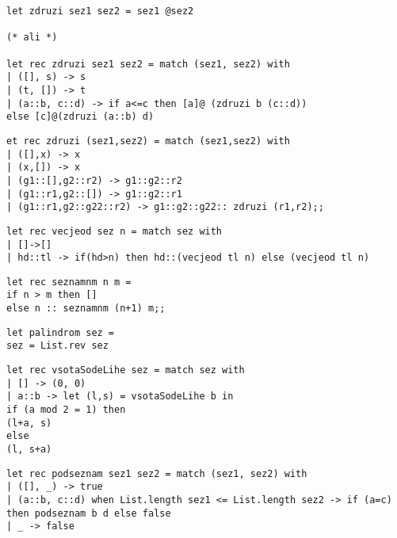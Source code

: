\begin{Odgovor}{2.10}
\begin{lstlisting}
let zdruzi sez1 sez2 = sez1 @sez2

(* ali *)

let rec zdruzi sez1 sez2 = match (sez1, sez2) with
| ([], s) -> s
| (t, []) -> t
| (a::b, c::d) -> if a<=c then [a]@ (zdruzi b (c::d))
else [c]@(zdruzi (a::b) d)
\end{lstlisting}
\end{Odgovor}
\begin{Odgovor}{2.11}
\begin{lstlisting}
et rec zdruzi (sez1,sez2) = match (sez1,sez2) with
| ([],x) -> x
| (x,[]) -> x
| (g1::[],g2::r2) -> g1::g2::r2
| (g1::r1,g2::[]) -> g1::g2::r1
| (g1::r1,g2::g22::r2) -> g1::g2::g22:: zdruzi (r1,r2);;
\end{lstlisting}
\end{Odgovor}
\begin{Odgovor}{2.12}
\begin{lstlisting}
let rec vecjeod sez n = match sez with
| []->[]
| hd::tl -> if(hd>n) then hd::(vecjeod tl n) else (vecjeod tl n)
\end{lstlisting}
\end{Odgovor}
\begin{Odgovor}{2.13}
\begin{lstlisting}
let rec seznamnm n m =
if n > m then []
else n :: seznamnm (n+1) m;;
\end{lstlisting}
\end{Odgovor}
\begin{Odgovor}{2.14}
\begin{lstlisting}
let palindrom sez =
sez = List.rev sez
\end{lstlisting}
\end{Odgovor}
\begin{Odgovor}{2.15}
\begin{lstlisting}
let rec vsotaSodeLihe sez = match sez with
| [] -> (0, 0)
| a::b -> let (l,s) = vsotaSodeLihe b in
if (a mod 2 = 1) then
(l+a, s)
else
(l, s+a)
\end{lstlisting}
\end{Odgovor}
\begin{Odgovor}{2.16}
\begin{lstlisting}
let rec podseznam sez1 sez2 = match (sez1, sez2) with
| ([], _) -> true
| (a::b, c::d) when List.length sez1 <= List.length sez2 -> if (a=c) then podseznam b d else false
| _ -> false
\end{lstlisting}
\end{Odgovor}
